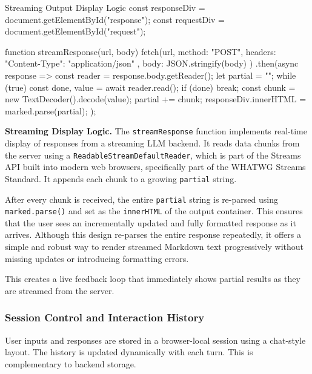 \begin{codeonly}{Streaming Output Display Logic}
const responseDiv = document.getElementById("response");
const requestDiv = document.getElementById("request");

function streamResponse(url, body) {
    fetch(url, {
        method: "POST",
        headers: { "Content-Type": "application/json" },
        body: JSON.stringify(body)
    })
    .then(async response => {
        const reader = response.body.getReader();
        let partial = "";
        while (true) {
            const { done, value } = await reader.read();
            if (done) break;
            const chunk = new TextDecoder().decode(value);
            partial += chunk;
            responseDiv.innerHTML = marked.parse(partial);
        }
    });
}
\end{codeonly}

{\bf Streaming Display Logic.}
The \texttt{streamResponse} function implements real-time display of responses from a streaming LLM backend. It reads data chunks from the server using a \texttt{ReadableStream\-DefaultReader}, which is part of the Streams API built into modern web browsers, specifically part of the WHATWG Streams Standard. It appends each chunk to a growing \texttt{partial} string. 

After every chunk is received, the entire \texttt{partial} string is re-parsed using \texttt{marked.parse()} and set as the \texttt{innerHTML} of the output container. This ensures that the user sees an incrementally updated and fully formatted response as it arrives. Although this design re-parses the entire response repeatedly, it offers a simple and robust way to render streamed Markdown text progressively without missing updates or introducing formatting errors.


This creates a live feedback loop that immediately shows partial results as they are streamed from the server.

%
\subsubsection*{Session Control and Interaction History}

User inputs and responses are stored in a browser-local session using a chat-style layout. The history is updated dynamically with each turn. This is complementary to backend storage. 

